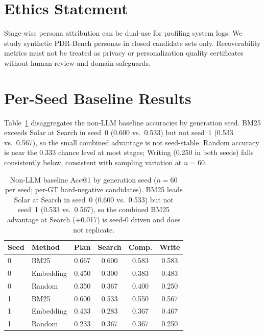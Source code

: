\documentclass[]{article}
\begin{document}
\section*{Ethics Statement}
Stage-wise persona attribution can be dual-use for profiling system logs.
We study synthetic PDR-Bench personas in closed candidate sets only.
Recoverability metrics must not be treated as privacy or personalization
quality certificates without human review and domain safeguards.



\appendix
\onecolumn

\section{Per-Seed Baseline Results}
\label{app:baselines_seed}

Table~\ref{tab:baselines_seed} disaggregates the non-LLM baseline
accuracies by generation seed. BM25 exceeds Solar at Search in seed~0
(0.600 vs.\ 0.533) but not seed~1 (0.533 vs.\ 0.567), so the small
combined advantage is not seed-stable. Random accuracy is near the 0.333
chance level at most stages; Writing (0.250 in both seeds) falls
consistently below, consistent with sampling variation at $n{=}60$.

\begin{table}[!ht]
\centering
\small
\begin{tabular}{llcccc}
\toprule
\textbf{Seed} & \textbf{Method} & \textbf{Plan} & \textbf{Search} & \textbf{Comp.} & \textbf{Write} \\
\midrule
0 & BM25      & 0.667 & 0.600 & 0.583 & 0.583 \\
0 & Embedding & 0.450 & 0.300 & 0.383 & 0.483 \\
0 & Random    & 0.350 & 0.367 & 0.400 & 0.250 \\
\midrule
1 & BM25      & 0.600 & 0.533 & 0.550 & 0.567 \\
1 & Embedding & 0.433 & 0.283 & 0.367 & 0.467 \\
1 & Random    & 0.233 & 0.367 & 0.367 & 0.250 \\
\bottomrule
\end{tabular}
\caption{Non-LLM baseline Acc@1 by generation seed ($n=60$ per seed;
  per-GT hard-negative candidates). BM25 leads Solar at Search in seed~0
  (0.600 vs.\ 0.533) but not seed~1 (0.533 vs.\ 0.567), so the combined
  BM25 advantage at Search (+0.017) is seed-0 driven and does not replicate.}
\label{tab:baselines_seed}
\end{table}
\end{document}
